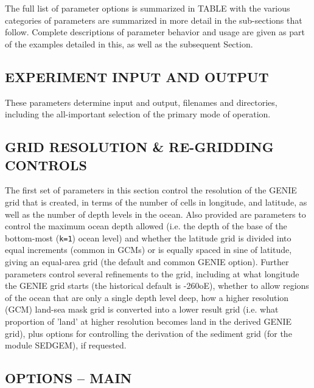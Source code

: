 \documentclass[11pt,fleqn]{book} %
\begin{document}
The full list of parameter options is summarized in TABLE with the various categories of parameters are summarized in more detail in the sub-sections that follow. Complete descriptions of parameter behavior and usage are given as part of the examples detailed in this, as well as the subsequent Section.


\subsection{EXPERIMENT INPUT AND OUTPUT}

These parameters determine input and output, filenames and directories, including the all-important selection of the primary mode of operation.


\subsection{GRID RESOLUTION \& RE-GRIDDING CONTROLS}

The first set of parameters in this section control the resolution of the GENIE grid that is created, in terms of the number of cells in longitude, and latitude, as well as the number of depth levels in the ocean. Also provided are parameters to control the maximum ocean depth allowed (i.e. the depth of the base of the bottom-most (\texttt{k=1}) ocean level) and whether the latitude grid is divided into equal increments (common in GCMs) or is equally spaced in sine of latitude, giving an equal-area grid (the default and common GENIE option). Further parameters control several refinements to the grid, including at what longitude the GENIE grid starts (the historical default is -260oE), whether to allow regions of the ocean that are only a single depth level deep, how a higher resolution (GCM) land-sea mask grid is converted into a lower result grid (i.e. what proportion of 'land' at higher resolution becomes land in the derived GENIE grid), plus options for controlling the derivation of the sediment grid (for the module SEDGEM), if requested.


\subsection{OPTIONS -- MAIN}
\end{document}
